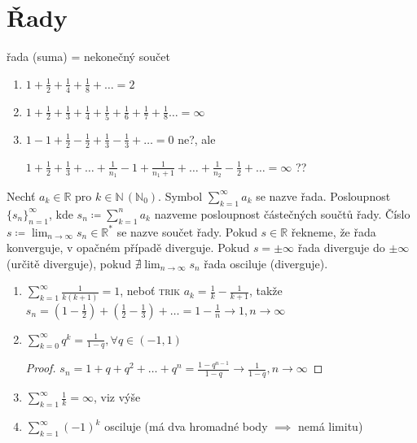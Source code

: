 \renewcommand{\thesection}{\arabic{section}}
\setcounter{section}{9}
\section{Řady}

\begin{priklad}[motivační]
  řada (suma) = nekonečný součet
  \begin{enumerate}[1)]
    \item $1+\frac{1}{2}+\frac{1}{4}+\frac{1}{8}+\dots=2$
    \item $1+\frac{1}{2}+\frac{1}{3}+\frac{1}{4}+\frac{1}{5}+\frac{1}{6}+\frac{1}{7}+\frac{1}{8}\dots=\infty$
    \item $1-1+\frac{1}{2}-\frac{1}{2}+\frac{1}{3}-\frac{1}{3}+\dots= 0$ ne?, ale

          $1+\frac{1}{2}+\frac{1}{3}+\dots+\frac{1}{n_1}-1+\frac{1}{n_1+1}+\dots+\frac{1}{n_2}-\frac{1}{2}+\dots = \infty$ ??
  \end{enumerate}
\end{priklad}

\begin{definice}
  Nechť $a_k \in \mathbb R$ pro $k \in \mathbb N \,(\mathbb N_0)$. Symbol $\sum_{k=1}^{\infty} a_k$ se nazve řada. Posloupnost $\{s_n\}_{n=1}^{\infty}$, kde $s_n \coloneq \sum_{k=1}^{n} a_k$ nazveme posloupnost částečných součtů řady. Číslo $s \coloneq \lim_{n \to \infty} s_n \in \mathbb R^*$ se nazve součet řady. Pokud $s \in \mathbb R$ řekneme, že řada konverguje, v opačném případě diverguje. Pokud $s = \pm \infty$ řada diverguje do $\pm \infty$ (určitě diverguje), pokud $\nexists \lim_{n\to \infty} s_n$ řada osciluje (diverguje).
\end{definice}

\begin{priklad}
  \begin{enumerate}[1)]
    \item $\sum_{k = 1}^{\infty} \frac{1}{k(k+1)} = 1$, neboť \textsc{trik} $a_k = \frac{1}{k}-\frac{1}{k+1}$, takže $s_n = (1- \frac{1}{2})+(\frac{1}{2}-\frac{1}{3})+\dots = 1 - \frac{1}{n} \to 1, n \to \infty$
    \item $\sum_{k=0}^{\infty} q^k = \frac{1}{1-q}, \forall q \in (-1,1)$

\begin{proof}
  $s_n = 1+q+q^2+\dots+q^n = \frac{1-q^{n-1}}{1-q} \to \frac{1}{1-q}, n \to \infty$
\end{proof}

    \item $\sum_{k=1}^{\infty} \frac{1}{k} = \infty$, viz výše
    \item $\sum_{k=1}^{\infty} (-1)^{k}$ osciluje (má dva hromadné body $\implies$ nemá limitu)
  \end{enumerate}
\end{priklad}

